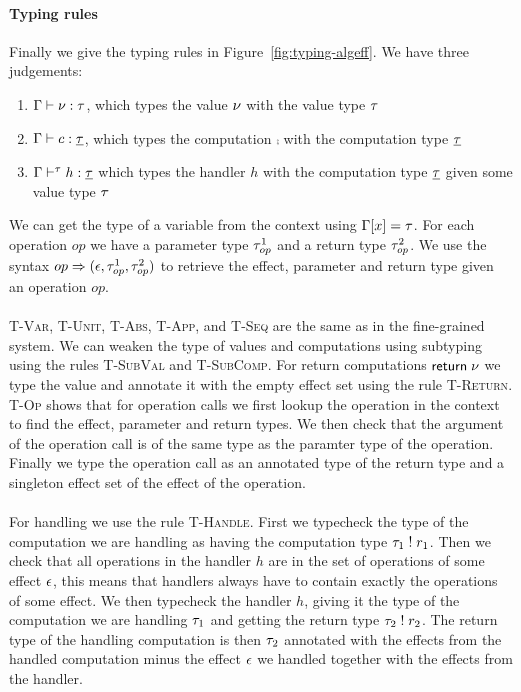 {\paragraph{Typing rules}
Finally we give the typing rules in Figure~\ref{fig:typing-algeff}.
We have three judgements:
\begin{enumerate}
\item $\Gamma \vdash \nu : \tau$, which types the value $\nu$ with the value type $\tau$
\item $\Gamma \vdash c : \underline{\tau}$, which types the computation $\comp$ with the computation type $\underline{\tau}$
\item $\Gamma \vdash^{\tau} h : \underline{\tau}$ which types the handler $h$ with the computation type $\underline{\tau}$ given some value type $\tau$
\end{enumerate}
We can get the type of a variable from the context using $\Gamma[x] = \tau$.
For each operation $op$ we have a parameter type $\tau^1_{op}$ and a return type $\tau^2_{op}$.
We use the syntax $op \Rightarrow (\epsilon, \tau^1_{op}, \tau^2_{op})$ to retrieve the effect, parameter and return type given an operation $op$.
\\\\
\textsc{T-Var}, \textsc{T-Unit}, \textsc{T-Abs}, \textsc{T-App}, and \textsc{T-Seq} are the same as in the fine-grained system.
We can weaken the type of values and computations using subtyping using the rules \textsc{T-SubVal} and \textsc{T-SubComp}.
For return computations $\mathsf{return} \; \nu$ we type the value and annotate it with the empty effect set using the rule \textsc{T-Return}.
\textsc{T-Op} shows that for operation calls we first lookup the operation in the context to find the effect, parameter and return types.
We then check that the argument of the operation call is of the same type as the paramter type of the operation.
Finally we type the operation call as an annotated type of the return type and a singleton effect set of the effect of the operation.
\\\\
For handling we use the rule \textsc{T-Handle}.
First we typecheck the type of the computation we are handling as having the computation type $\tau_1 \; ! \; r_1$.
Then we check that all operations in the handler $h$ are in the set of operations of some effect $\epsilon$, this means that handlers always have to contain exactly the operations of some effect.
We then typecheck the handler $h$, giving it the type of the computation we are handling $\tau_1$  and getting the return type $\tau_2 \; ! \; r_2$.
The return type of the handling computation is then $\tau_2$ annotated with the effects from the handled computation minus the effect $\epsilon$ we handled together with the effects from the handler.
}
